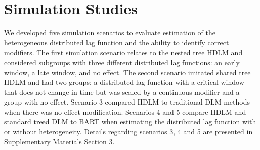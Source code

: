 \documentclass[12pt]{article}
\begin{document}







\section{Simulation Studies}\label{sec:sim}

We developed five simulation scenarios to evaluate estimation of the heterogeneous distributed lag function and the ability to identify correct modifiers. The first simulation scenario relates to the nested tree HDLM and considered subgroups with three different distributed lag functions: an early window, a late window, and no effect. The second scenario imitated shared tree HDLM and had two groups: a distributed lag function with a critical window that does not change in time but was scaled by a continuous modifier and a group with no effect. Scenario 3 compared HDLM to traditional DLM methods when there was no effect modification. Scenarios 4 and 5 compare HDLM and standard treed DLM to BART when estimating the distributed lag function with or without heterogeneity. Details regarding scenarios 3, 4 and 5 are presented in Supplementary Materials Section 3.
\end{document}
